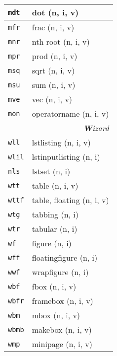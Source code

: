 \documentclass[oneside,10pt,landscape,DIV17]{scrartcl}
\newcommand{\Map}[1] {\textbf{\textasciiacute}\texttt{#1}}
\begin{document}
\begin{multicols}{3}
\begin{center}
\begin{tabular}[]{|p{11mm}|p{62mm}|}
\hline  \Map{mdt} & dot                       \hfill (n, i, v)\\
\hline  \Map{mfr} & frac                      \hfill (n, i, v)\\
\hline  \Map{mnr} & nth root                  \hfill (n, i, v)\\
\hline  \Map{mpr} & prod                      \hfill (n, i, v)\\
\hline  \Map{msq} & sqrt                      \hfill (n, i, v)\\
\hline  \Map{msu} & sum                       \hfill (n, i, v)\\
\hline  \Map{mve} & vec                       \hfill (n, i, v)\\
\hline  \Map{mon} & operatorname              \hfill (n, i, v)\\
\hline
\hline
\multicolumn{2}{|r|}{\textsl{\textbf{W}izard}}\\[1.0ex]
\hline  \Map{wll}  & lstlisting               \hfill (n, i, v)\\
\hline  \Map{wlil} & lstinputlisting          \hfill (n, i)\\
\hline  \Map{nls}  & lstset                   \hfill (n, i)\\
\hline
\hline  \Map{wtt}  & table                    \hfill (n, i, v)\\
\hline  \Map{wttf} & table, floating          \hfill (n, i, v)\\
\hline  \Map{wtg}  & tabbing                  \hfill (n, i)\\
\hline  \Map{wtr}  & tabular                  \hfill (n, i)\\
\hline
\hline  \Map{wf}   & figure                   \hfill (n, i)\\
\hline  \Map{wff}  & floatingfigure           \hfill (n, i)\\
\hline  \Map{wwf}  & wrapfigure               \hfill (n, i)\\
\hline
\hline  \Map{wbf}  & fbox                     \hfill (n, i, v)\\
\hline  \Map{wbfr} & framebox                 \hfill (n, i, v)\\
\hline  \Map{wbm}  & mbox                     \hfill (n, i, v)\\
\hline  \Map{wbmb} & makebox                  \hfill (n, i, v)\\
\hline  \Map{wmp}  & minipage                 \hfill (n, i, v)\\

\end{tabular}
\end{center}
\end{multicols}
\end{document}
